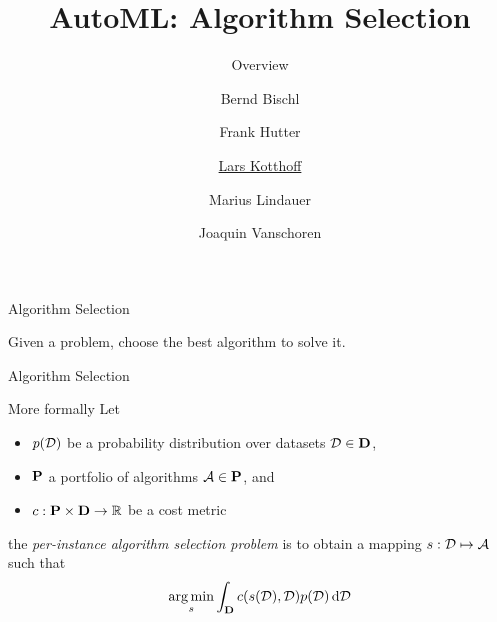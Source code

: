 




\title[AutoML: Overview]{AutoML: Algorithm Selection} %
\subtitle{Overview} %
\author[Marius Lindauer]{Bernd Bischl \and Frank Hutter \and \underline{Lars Kotthoff}\newline \and Marius Lindauer \and Joaquin Vanschoren}
\institute{}
\date{}





	
	\maketitle
	


\begin{frame}[c]{Algorithm Selection}
    \begin{center}
        \Large{Given a problem, choose the best algorithm to solve it.}
    \end{center}
\end{frame}

\begin{frame}[c]{Algorithm Selection}
\begin{block}{More formally}
        Let 
        \begin{itemize}
                \item $p(\mathcal{D})$ be a probability distribution over datasets $\mathcal{D} \in \mathbf{D}$,
                \item $\mathbf{P}$ a portfolio of algorithms $\mathcal{A} \in \mathbf{P}$, and
                \item $c: \mathbf{P} \times \mathbf{D} \rightarrow \mathbb{R}$ be a cost metric   
        \end{itemize}
        
        the \emph{per-instance algorithm selection problem} is to obtain a mapping 
        $s: \mathcal{D} \mapsto \mathcal{A}$ 
        such that
        $$\operatorname*{arg\,min}_{s} \int_{\mathbf{D}} c(s(\mathcal{D}),\mathcal{D}) p(\mathcal{D}) \mathop{}\!\mathrm{d}\mathcal{D}$$
\end{block}

\end{frame}

